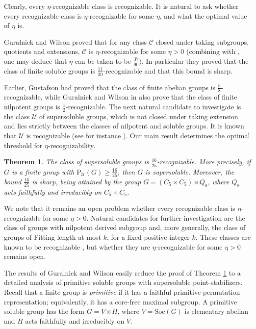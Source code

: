 \documentclass[10pt,a4paper]{amsart}
\newtheorem{theorem}{Theorem}
\newcommand{\Psu}{\mathrm{P}_{\mathcal{U}}}
\begin{document}
	Clearly, every $\eta$-recognizable class is recognizable. 
	It is natural to ask whether every recognizable class 
	is $\eta$-recognizable for some $\eta$, and what the optimal 
	value of $\eta$ is.
	
	Guralnick and Wilson \cite{GW00} proved that for any class 
	$\mathcal{C}$ closed under taking subgroups, quotients and 
	extensions, $\mathcal{C}$ is $\eta$-recognizable for some 
	$\eta > 0$ (combining \cite[Proposition 5]{mqrd} with \cite[Theorem
	1.1]{mqrd}, one may deduce that $\eta$ can be taken to be $\frac{37}{90})$.
	In particular they proved that the class 
	of finite soluble groups is $\frac{11}{30}$-recognizable
	and that this bound is sharp. 
	
	Earlier, 
	Gustafson \cite{Gus73} had proved that the class of finite  abelian 
	groups is $\frac{5}{8}$-recognizable, while Guralnick and Wilson in \cite{GW00} also prove that the class of finite nilpotent groups is $\frac{1}{2}$-recognizable. The next natural candidate to investigate is the class 
	$\mathcal{U}$ of supersoluble groups, which is not closed under taking extension and lies strictly 
	between the classes of nilpotent and soluble groups. 
	It is known that $\mathcal{U}$ is recognizable 
	(see for instance \cite[Example 1]{BH09}).
	 Our main result determines the 
	optimal threshold for $\eta$-recognizability.
	

	

	

	\begin{theorem}\label{thm:main}
		The class of supersoluble groups is $\frac{16}{25}$-recognizable. 
		More precisely, if $G$ is a finite group with 
		$\Psu(G) \geq \frac{16}{25}$, then $G$ is supersoluble. 
		Moreover, the bound $\frac{16}{25}$ is sharp, being attained 
		by the group $G = (C_5 \times C_5) \rtimes Q_8$, where $Q_8$ 
		acts faithfully and irreducibly on $C_5 \times C_5$.
	\end{theorem}

	
We note that it remains an open problem whether every 
recognizable class is $\eta$-recognizable for some 
$\eta > 0$. Natural candidates for further investigation 
are the class of groups with nilpotent derived subgroup 
and, more generally, the class of groups of Fitting length 
at most $k$, for a fixed positive integer $k$. These classes 
are known to be recognizable \cite[Examples 2 and 3]{BH09}, 
but whether they are $\eta$-recognizable for some $\eta > 0$ 
remains open.
	
	The results of Guralnick and Wilson easily reduce the proof of Theorem \ref{thm:main} to 
	 a detailed analysis of primitive soluble
	  groups with supersoluble point-stabilizers. 
	Recall that a finite group is \textit{primitive} if it has a 
	faithful primitive permutation representation; equivalently, 
	it has a core-free maximal subgroup. A primitive soluble group 
	has the form $G = V \rtimes H$, where $V = \mathrm{Soc}(G)$ is 
	elementary abelian and $H$ acts faithfully and irreducibly on $V$.
	
\end{document}
